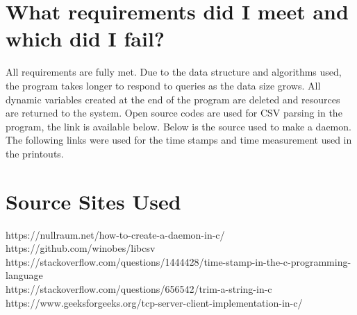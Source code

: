 \documentclass{article}
\begin{document}
\newpage
\section{What requirements did I meet and which did I fail?}
\quad All requirements are fully met. Due to the data structure and algorithms used, the program takes longer to respond to queries as the data size grows. All dynamic variables created at the end of the program are deleted and resources are returned to the system. Open source codes are used for CSV parsing in the program, the link is available below. Below is the source used to make a daemon. The following links were used for the time stamps and time measurement used in the printouts.\\



\section{Source Sites Used}
\quad https://nullraum.net/how-to-create-a-daemon-in-c/\\
https://github.com/winobes/libcsv\\
https://stackoverflow.com/questions/1444428/time-stamp-in-the-c-programming-language\\
https://stackoverflow.com/questions/656542/trim-a-string-in-c\\
https://www.geeksforgeeks.org/tcp-server-client-implementation-in-c/
\end{document}
